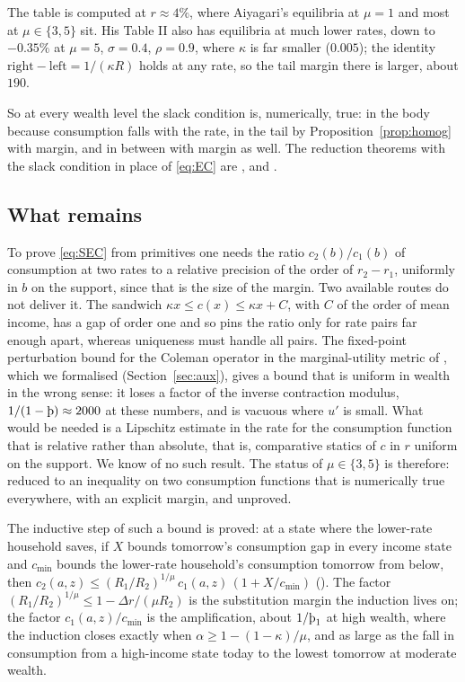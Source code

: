 The table is computed at $r\approx4\%$, where Aiyagari's equilibria at $\mu=1$ and most at
$\mu\in\{3,5\}$ sit. His Table II also has equilibria at much lower rates, down to $-0.35\%$ at
$\mu=5$, $\sigma=0.4$, $\rho=0.9$, where $\kappa$ is far smaller ($0.005$); the identity
$\text{right}-\text{left}=1/(\kappa R)$ holds at any rate, so the tail margin there is larger,
about $190$.

So at every wealth level the slack condition is, numerically, true: in the body because
consumption falls with the rate, in the tail by Proposition~\ref{prop:homog} with margin, and in
between with margin as well. The reduction theorems with the slack condition in place of
\eqref{eq:EC} are ,
 and
.

\subsection{What remains}\label{sec:frontier}

To prove \eqref{eq:SEC} from primitives one needs the ratio $c_2(b)/c_1(b)$ of consumption at two
rates to a relative precision of the order of $r_2-r_1$, uniformly in $b$ on the support, since
that is the size of the margin. Two available routes do not deliver it. The sandwich
$\kappa x\le c(x)\le\kappa x+C$, with $C$ of the order of mean income, has a gap of order one and
so pins the ratio only for rate pairs far enough apart, whereas uniqueness must handle all pairs.
The fixed-point perturbation bound for the Coleman operator in the marginal-utility metric of
\citet{LiStachurski2014}, which we formalised (Section~\ref{sec:aux}), gives a bound that is
uniform in wealth in the wrong sense: it loses a factor of the inverse contraction modulus,
$1/(1-\Thorn)\approx2000$ at these numbers, and is vacuous where $u'$ is small. What would be
needed is a Lipschitz estimate in the rate for the consumption function that is relative rather than
absolute, that is, comparative statics of $c$ in $r$ uniform on the support. We know of no such
result. The status of $\mu\in\{3,5\}$ is therefore: reduced to an inequality on two consumption
functions that is numerically true everywhere, with an explicit margin, and unproved.

The inductive step of such a bound is proved: at a state where the lower-rate household saves,
if $X$ bounds tomorrow's consumption gap in every income state and $c_{\min}$ bounds the
lower-rate household's consumption tomorrow from below, then
$c_2(a,z)\le (R_1/R_2)^{1/\mu}\,c_1(a,z)\,(1+X/c_{\min})$ (). The
factor $(R_1/R_2)^{1/\mu}\le1-\Delta r/(\mu R_2)$ is the substitution margin the induction lives
on; the factor $c_1(a,z)/c_{\min}$ is the amplification, about $1/\Thorn_1$ at high wealth, where
the induction closes exactly when $\alpha\ge1-(1-\kappa)/\mu$, and as large as the fall in
consumption from a high-income state today to the lowest tomorrow at moderate wealth.

